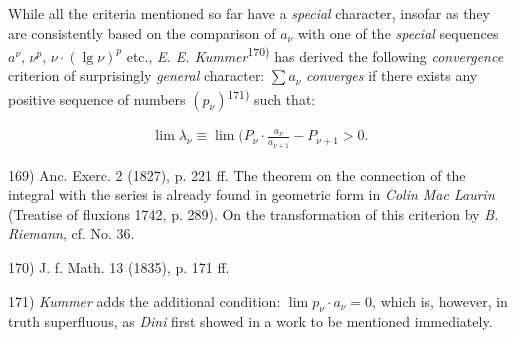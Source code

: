 While all the criteria mentioned so far have a \textit{special} character, insofar as they are consistently based on the comparison of $a_\nu$ with one of the \textit{special} sequences $a^\nu$, $\nu^p$, $\nu \cdot (\lg \nu)^p$ etc., \textit{E. E. Kummer}\textsuperscript{170)} has derived the following \textit{convergence} criterion of surprisingly \textit{general} character: $\sum a_\nu$ \textit{converges} if there exists any positive sequence of numbers $(p_\nu)$\textsuperscript{171)} such that:

\begin{align}
\lim \lambda_\nu \equiv \lim (P_\nu \cdot \frac{a_\nu}{a_{\nu+1}} - P_{\nu + 1} > 0.
\end{align}

\vfill
\leftline{\rule{2in}{0.4pt}}
\vspace{0.2cm}
{
\footnotesize
169) Anc. Exerc. 2 (1827), p. 221 ff. The theorem on the connection of the integral with the series is already found in geometric form in \textit{Colin Mac Laurin} (Treatise of fluxions 1742, p. 289). On the transformation of this criterion by \textit{B. Riemann}, cf. No. 36.

170) J. f. Math. 13 (1835), p. 171 ff.

171) \textit{Kummer} adds the additional condition: $\lim p_\nu \cdot a_\nu = 0$, which is, however, in truth superfluous, as \textit{Dini} first showed in a work to be mentioned immediately.

}
